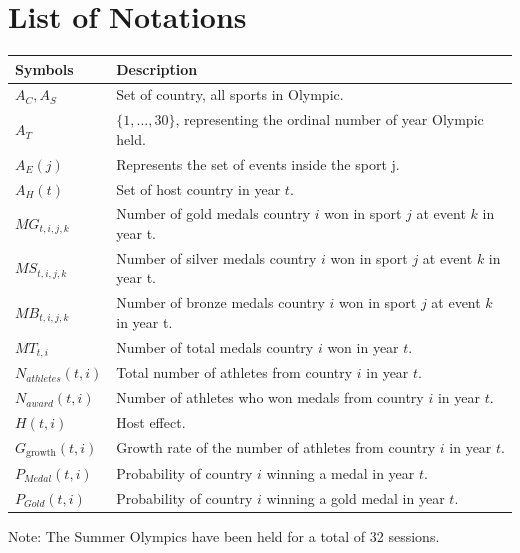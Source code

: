 \documentclass{mcmthesis}
\begin{document}
\section{List of Notations}
\begin{center}
	\begin{tabular}{ll}
		\toprule
		{\bf Symbols} & {\bf Description}  \\
		\midrule 
		$A_{C},A_{S}$ & Set of country, all sports in Olympic.\\
		$A_{T}$ & $\{1,\dots,30\}$, representing the ordinal number of year Olympic held. \\
		$A_E(j)$ & Represents the set of events inside the sport j.\\
		$A_{H}(t)$ & Set of host country in year $t$. \\
		$MG_{t,i,j,k}$ & Number of gold medals country $i$ won in sport $j$ at event $k$ in year t. \\
		$MS_{t,i,j,k}$ & Number of silver medals country $i$ won in sport $j$ at event $k$ in year t. \\
		$MB_{t,i,j,k}$ & Number of bronze medals country $i$ won in sport $j$ at event $k$ in year t. \\
		$MT_{t,i}$ & Number of total medals country $i$ won in year $t$. \\
		$N_{athletes}(t,i)$ & Total number of athletes from country $i$ in year $t$. \\
		$N_{award}(t,i)$ & Number of athletes who won medals from country $i$ in year $t$. \\
		$H(t,i)$ & Host effect. \\
		$G_{\text{growth}}(t,i)$ & Growth rate of the number of athletes from country $i$ in year $t$.\\
		$P_{Medal}(t,i)$ & Probability of country $i$ winning a medal in year $t$.\\
		$P_{Gold}(t,i)$ & Probability of country $i$ winning a gold medal in year $t$.\\
		\bottomrule
	\end{tabular}
\end{center}

\noindent Note: The Summer Olympics have been held for a total of 32 sessions.
	
	
	
	
	
	
	
	
	
\end{document}
